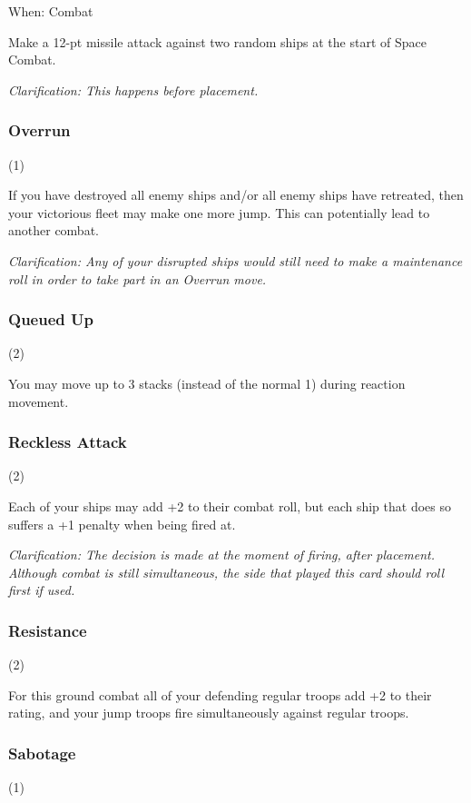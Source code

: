 When: Combat

Make a 12-pt missile attack against two random ships at the start of Space Combat.

\textit{Clarification: This happens before placement.}

\subsubsection{Overrun} (1)


If you have destroyed all enemy ships and/or all enemy ships have retreated, then your victorious fleet may make one more jump. This can potentially lead to another combat.

\textit{Clarification: Any of your disrupted ships would still need to make a maintenance roll in order to take part in an Overrun move.}

\subsubsection{Queued Up} (2)


You may move up to 3 stacks (instead of the normal 1) during reaction movement.

\subsubsection{Reckless Attack} (2)


Each of your ships may add +2 to their combat roll, but each ship that does so suffers a +1 penalty when being fired at.

\textit{Clarification: The decision is made at the moment of firing, after placement. Although combat is still simultaneous, the side that played this card should roll first if used.}

\subsubsection{Resistance} (2)


For this ground combat all of your defending regular troops add +2 to their rating, and your jump troops fire simultaneously against regular troops.

\subsubsection{Sabotage} (1)

